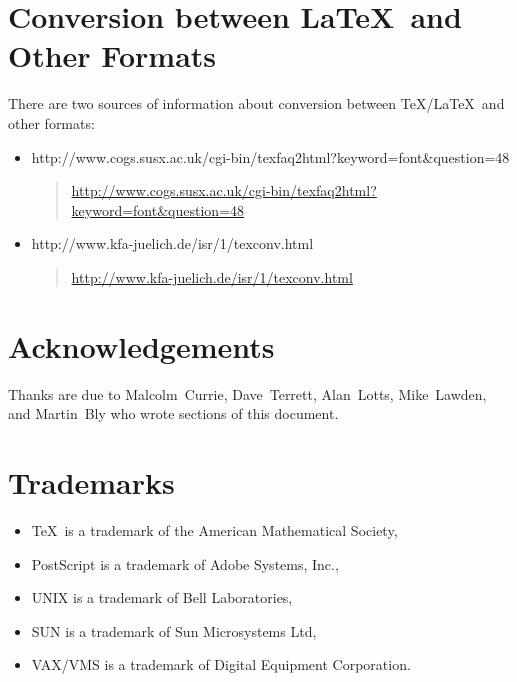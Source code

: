 \documentclass[11pt,twoside,nolof]{starlink}
\begin{document}
\section{\label{conversion}Conversion between \LaTeX\ and Other Formats}

There are two sources of information about conversion between \TeX/\LaTeX\ and
other formats:

\begin{itemize}
  \item {}
    {http://www.cogs.susx.ac.uk/cgi-bin/texfaq2html?keyword=font&question=48}
    \begin{latexonly}
      \begin{quote}
\url{http://www.cogs.susx.ac.uk/cgi-bin/texfaq2html?keyword=font\&question=48}
      \end{quote}
    \end{latexonly}
  \item {}
    {http://www.kfa-juelich.de/isr/1/texconv.html}
    \begin{latexonly}
      \begin{quote}
\url{http://www.kfa-juelich.de/isr/1/texconv.html}
      \end{quote}
    \end{latexonly}
\end{itemize}


\section{\label{acknowledgements}Acknowledgements}

Thanks are due to Malcolm~Currie, Dave~Terrett, Alan~Lotts,
Mike~Lawden, and Martin~Bly who wrote sections of this document.

\section{\label{trademarks}Trademarks}
\begin{itemize}
\item \TeX\ is a trademark of the American Mathematical Society,
\item PostScript is a trademark of Adobe Systems, Inc.,
\item UNIX is a trademark of Bell Laboratories,
\item SUN is a trademark of Sun Microsystems Ltd,
\item VAX/VMS is a trademark of Digital Equipment Corporation.
\end{itemize}

\newpage
{}~

\typeout{}
\typeout{}
\typeout{}
\typeout{}
\end{document}
